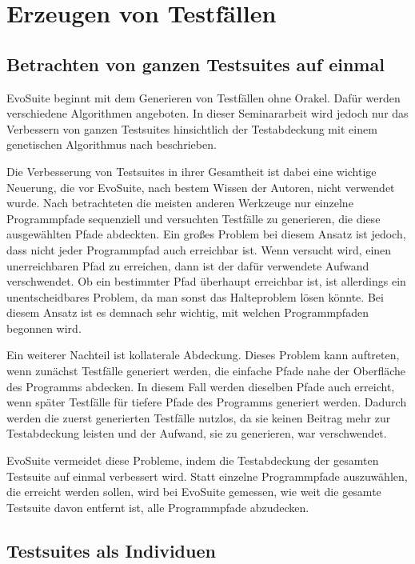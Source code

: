 \documentclass[a4paper,11pt]{article}
\begin{document}
\section{Erzeugen von Testfällen}
\label{sec:erzeugen_von_testfaellen}

\subsection{Betrachten von ganzen Testsuites auf einmal}

EvoSuite beginnt mit dem Generieren von Testfällen ohne Orakel.
Dafür werden verschiedene Algorithmen angeboten.
In dieser Seminararbeit wird jedoch nur das Verbessern von ganzen Testsuites hinsichtlich der Testabdeckung mit einem genetischen Algorithmus nach \cite{TSE12_EvoSuite} beschrieben.

Die Verbesserung von Testsuites in ihrer Gesamtheit ist dabei eine wichtige Neuerung, die vor EvoSuite, nach bestem Wissen der Autoren, nicht verwendet wurde.
Nach \cite{TSE12_EvoSuite} betrachteten die meisten anderen Werkzeuge nur einzelne Programmpfade sequenziell und versuchten Testfälle zu generieren, die diese ausgewählten Pfade abdeckten.
Ein großes Problem bei diesem Ansatz ist jedoch, dass nicht jeder Programmpfad auch erreichbar ist.
Wenn versucht wird, einen unerreichbaren Pfad zu erreichen, dann ist der dafür verwendete Aufwand verschwendet.
Ob ein bestimmter Pfad überhaupt erreichbar ist, ist allerdings ein unentscheidbares Problem, da man sonst das Halteproblem lösen könnte.
Bei diesem Ansatz ist es demnach sehr wichtig, mit welchen Programmpfaden begonnen wird.

Ein weiterer Nachteil ist kollaterale Abdeckung.
Dieses Problem kann auftreten, wenn zunächst Testfälle generiert werden, die einfache Pfade nahe der Oberfläche des Programms abdecken.
In diesem Fall werden dieselben Pfade auch erreicht, wenn später Testfälle für tiefere Pfade des Programms generiert werden.
Dadurch werden die zuerst generierten Testfälle nutzlos, da sie keinen Beitrag mehr zur Testabdeckung leisten und der Aufwand, sie zu generieren, war verschwendet.

EvoSuite vermeidet diese Probleme, indem die Testabdeckung der gesamten Testsuite auf einmal verbessert wird.
Statt einzelne Programmpfade auszuwählen, die erreicht werden sollen, wird bei EvoSuite gemessen, wie weit die gesamte Testsuite davon entfernt ist, alle Programmpfade abzudecken.

\subsection{Testsuites als Individuen}
\end{document}
